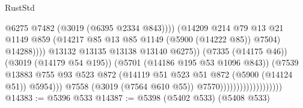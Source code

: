 \begin{lexlean}{RustStd}
\begin{coremodule}
                                                          @6275
                                                          @7482
                                                          (@3019 (@6395 @2334 @843))))
                                                      (@14209
                                                        @214
                                                        @79
                                                        @13
                                                        @21
                                                        @1149
                                                        @859
                                                        (@14217
                                                          @85
                                                          @13
                                                          @85
                                                          @1149
                                                          (@5900 (@14222 @85))
                                                          @7504)
                                                        @14288))))
                                                @13132
                                                @13135
                                                @13138
                                                @13140
                                                @6275))
                                            (@7335 (@14175 @46))
                                            (@3019 (@14179 @54 @195))
                                            (@5701 (@14186 @195 @53 @1096 @843))
                                            (@7539
                                              @13883
                                              @755
                                              @93
                                              @523
                                              @872
                                              (@14119
                                                @51
                                                @523
                                                @51
                                                @872
                                                (@5900 (@14124 @51))
                                                @5954)))
                                          @7558
                                          (@3019 (@7564 @610 @55))
                                          @7570)))))))))))))))))))
@14383 := @5396 @533
@14387 := @5398 (@5402 @533) (@5408 @533)

\end{coremodule}
\end{lexlean}
